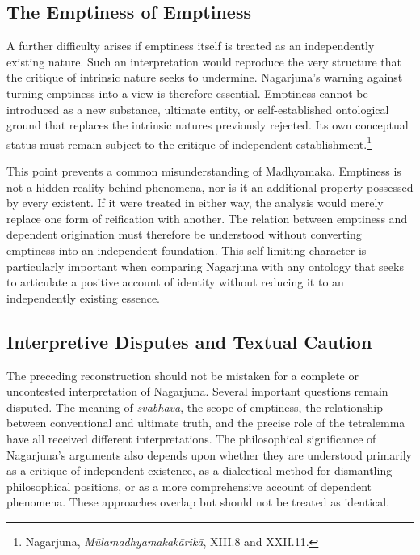 \subsection{The Emptiness of Emptiness}
\label{subsec:ch08_s18_ss12}

\label{para:VS.B01.P01.C08.S18.SS12.P001}
A further difficulty arises if emptiness itself is treated as an independently existing nature. Such an interpretation would reproduce the very structure that the critique of intrinsic nature seeks to undermine. Nagarjuna's warning against turning emptiness into a view is therefore essential. Emptiness cannot be introduced as a new substance, ultimate entity, or self-established ontological ground that replaces the intrinsic natures previously rejected. Its own conceptual status must remain subject to the critique of independent establishment.\footnote{Nagarjuna, \emph{M\={u}lamadhyamakak\={a}rik\={a}}, XIII.8 and XXII.11.}

\label{para:VS.B01.P01.C08.S18.SS12.P002}
This point prevents a common misunderstanding of Madhyamaka. Emptiness is not a hidden reality behind phenomena, nor is it an additional property possessed by every existent. If it were treated in either way, the analysis would merely replace one form of reification with another. The relation between emptiness and dependent origination must therefore be understood without converting emptiness into an independent foundation. This self-limiting character is particularly important when comparing Nagarjuna with any ontology that seeks to articulate a positive account of identity without reducing it to an independently existing essence.

\subsection{Interpretive Disputes and Textual Caution}
\label{subsec:ch08_s18_ss13}

\label{para:VS.B01.P01.C08.S18.SS13.P001}
The preceding reconstruction should not be mistaken for a complete or uncontested interpretation of Nagarjuna. Several important questions remain disputed. The meaning of \emph{svabh\={a}va}, the scope of emptiness, the relationship between conventional and ultimate truth, and the precise role of the tetralemma have all received different interpretations. The philosophical significance of Nagarjuna's arguments also depends upon whether they are understood primarily as a critique of independent existence, as a dialectical method for dismantling philosophical positions, or as a more comprehensive account of dependent phenomena. These approaches overlap but should not be treated as identical.

